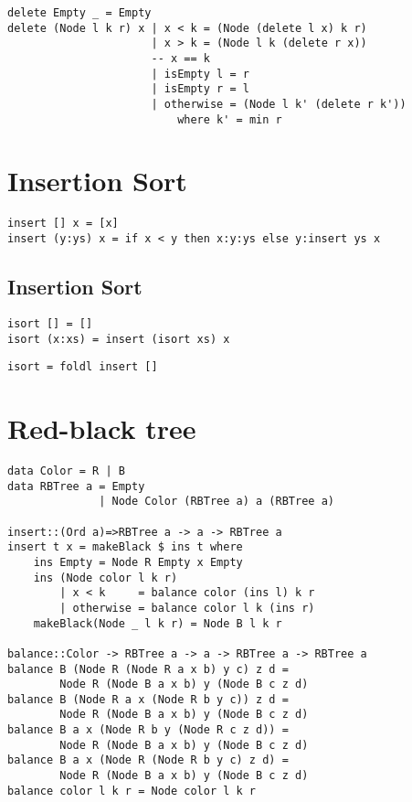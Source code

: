 \documentclass{article}
\begin{document}
\begin{lstlisting}[caption=BST deletion]
delete Empty _ = Empty
delete (Node l k r) x | x < k = (Node (delete l x) k r)
                      | x > k = (Node l k (delete r x))
                      -- x == k
                      | isEmpty l = r
                      | isEmpty r = l
                      | otherwise = (Node l k' (delete r k'))
                          where k' = min r
\end{lstlisting}

\section{Insertion Sort}

\begin{lstlisting}[caption=ordered insertion]
insert [] x = [x]
insert (y:ys) x = if x < y then x:y:ys else y:insert ys x
\end{lstlisting}

\subsection{Insertion Sort}

\begin{lstlisting}[caption=recursive insertion sort]
isort [] = []
isort (x:xs) = insert (isort xs) x
\end{lstlisting}

\begin{lstlisting}[caption=define insertion sort with fold]
isort = foldl insert []
\end{lstlisting}

\section{Red-black tree}

\begin{lstlisting}[caption=Red-black tree insertion with pattern matching]
data Color = R | B
data RBTree a = Empty
              | Node Color (RBTree a) a (RBTree a)

insert::(Ord a)=>RBTree a -> a -> RBTree a
insert t x = makeBlack $ ins t where
    ins Empty = Node R Empty x Empty
    ins (Node color l k r)
        | x < k     = balance color (ins l) k r
        | otherwise = balance color l k (ins r)
    makeBlack(Node _ l k r) = Node B l k r

balance::Color -> RBTree a -> a -> RBTree a -> RBTree a
balance B (Node R (Node R a x b) y c) z d =
        Node R (Node B a x b) y (Node B c z d)
balance B (Node R a x (Node R b y c)) z d =
        Node R (Node B a x b) y (Node B c z d)
balance B a x (Node R b y (Node R c z d)) =
        Node R (Node B a x b) y (Node B c z d)
balance B a x (Node R (Node R b y c) z d) =
        Node R (Node B a x b) y (Node B c z d)
balance color l k r = Node color l k r

\end{lstlisting}
\end{document}
